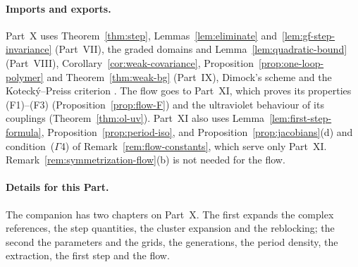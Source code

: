 \paragraph{Imports and exports.} Part~X uses Theorem~\ref{thm:step}, Lemmas~\ref{lem:eliminate} and~\ref{lem:gf-step-invariance} (Part~VII), the graded domains and Lemma~\ref{lem:quadratic-bound} (Part~VIII), Corollary~\ref{cor:weak-covariance}, Proposition~\ref{prop:one-loop-polymer} and Theorem~\ref{thm:weak-bg} (Part~IX), Dimock's scheme \cite{DimockI} and the Koteck\'y--Preiss criterion \cite{KP}. The flow goes to Part~XI, which proves its properties (F1)--(F3) (Proposition~\ref{prop:flow-F}) and the ultraviolet behaviour of its couplings (Theorem~\ref{thm:ol-uv}). Part~XI also uses Lemma~\ref{lem:first-step-formula}, Proposition~\ref{prop:period-iso}, and Proposition~\ref{prop:jacobians}(d) and condition~($\Gamma$4) of Remark~\ref{rem:flow-constants}, which serve only Part~XI. Remark~\ref{rem:symmetrization-flow}(b) is not needed for the flow.

\paragraph{Details for this Part.} The companion has two chapters on Part~X. The first expands the complex references, the step quantities, the cluster expansion and the reblocking; the second the parameters and the grids, the generations, the period density, the extraction, the first step and the flow.
